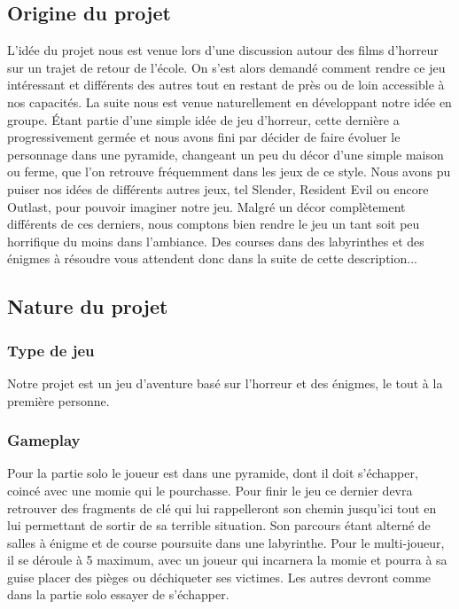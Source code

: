 \documentclass[12pt,a4paper]{article}
\begin{document}
\subsection{Origine du projet}
L'idée du projet nous est venue lors d'une discussion autour des films
d'horreur sur un trajet de retour de l'école. On s'est alors demandé comment rendre ce
jeu intéressant et différents des autres tout en restant de près ou de loin accessible à nos capacités.
La suite nous est venue naturellement en développant
notre idée en groupe. Étant partie d'une simple idée de jeu d'horreur, cette dernière a progressivement germée et
nous avons fini par décider de faire évoluer le personnage dans une pyramide, changeant un peu du
décor d'une simple maison ou ferme, que l'on retrouve fréquemment dans les jeux de ce style.
Nous avons pu puiser nos idées de différents autres jeux, tel Slender, Resident Evil ou encore Outlast,
pour pouvoir imaginer notre jeu. Malgré un décor complètement différents de ces derniers, nous
comptons bien rendre le jeu un tant soit peu horrifique du moins dans l'ambiance.
Des courses dans des labyrinthes et des énigmes à résoudre vous attendent donc dans la suite de cette
description...

\newpage
\subsection{Nature du projet}
\subsubsection{Type de jeu}
Notre projet est un jeu d'aventure basé sur l'horreur et des énigmes, le tout à la première personne.
\subsubsection{Gameplay}
Pour la partie solo le joueur est dans une pyramide, dont il doit s'échapper, coincé avec une momie qui le pourchasse. Pour finir le jeu ce dernier devra retrouver des fragments de clé qui lui rappelleront son chemin jusqu'ici tout en lui permettant de sortir de sa terrible situation. Son parcours étant alterné de salles à énigme et de course poursuite dans une labyrinthe.
Pour le multi-joueur, il se déroule à 5 maximum, avec un joueur qui incarnera la momie et pourra à sa guise placer des pièges ou déchiqueter ses victimes.
Les autres devront comme dans la partie solo essayer de s'échapper.
\end{document}
